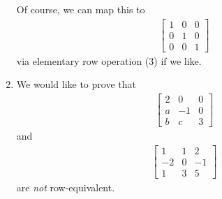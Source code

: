 \documentclass[12pt]{article}
\begin{document}
\begin{enumerate}
      Of course, we can map this to
      \begin{align*}
        \begin{bmatrix}
          1 & 0 & 0\\
          0 & 1 & 0\\
          0 & 0 & 1
        \end{bmatrix}
      \end{align*}
      via elementary row operation (3) if we like.

    \item
      We would like to prove that
      \begin{align*}
        \begin{bmatrix}
          2 &  0 & 0\\
          a & -1 & 0\\
          b &  c & 3
        \end{bmatrix}
      \end{align*}
      and
      \begin{align*}
        \begin{bmatrix}
           1 &  1 &  2\\
          -2 &  0 & -1\\
           1 &  3 &  5
        \end{bmatrix}
      \end{align*}
      are \textit{not} row-equivalent.


\end{enumerate}
\end{document}
